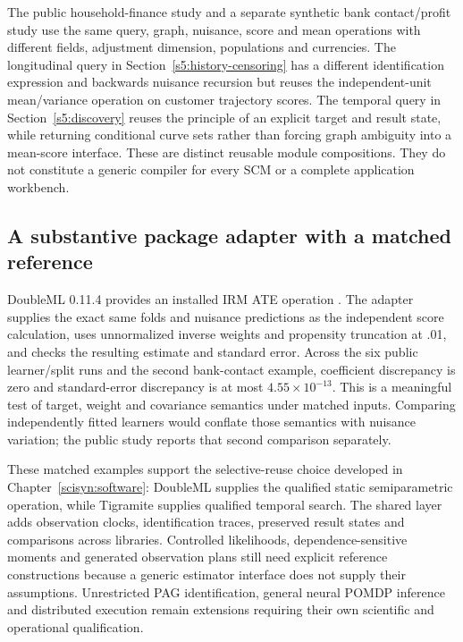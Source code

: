 The public household-finance study and a separate synthetic bank contact/profit
study use the same query, graph, nuisance, score and mean operations with
different fields, adjustment dimension, populations and currencies. The
longitudinal query in Section~\ref{s5:history-censoring} has a different
identification expression and backwards nuisance recursion but reuses the
independent-unit mean/variance operation on customer trajectory scores.
The temporal query in Section~\ref{s5:discovery} reuses the principle of an
explicit target and result state, while returning conditional curve sets
rather than forcing graph ambiguity into a mean-score interface. These are
distinct reusable module compositions. They do not constitute a generic
compiler for every SCM or a complete application workbench.

\subsection{A substantive package adapter with a matched reference}
DoubleML 0.11.4 provides an installed IRM ATE operation
\citep{doubleml2022,runtime_doubleml_scope}. The adapter supplies the exact
same folds and nuisance predictions as the independent score calculation,
uses unnormalized inverse weights and propensity truncation at .01, and
checks the resulting estimate and standard error. Across the six public
learner/split runs and the second bank-contact example, coefficient
discrepancy is zero and standard-error discrepancy is at most
$4.55\times10^{-13}$. This is a meaningful test of target, weight and
covariance semantics under matched inputs. Comparing independently fitted
learners would conflate those semantics with nuisance variation; the public
study reports that second comparison separately.

These matched examples support the selective-reuse choice developed in
Chapter~\ref{scisyn:software}: DoubleML supplies the qualified static
semiparametric operation, while Tigramite supplies qualified temporal search.
The shared layer adds observation clocks, identification traces, preserved
result states and comparisons across libraries. Controlled likelihoods,
dependence-sensitive moments and generated observation plans still need
explicit reference constructions because a generic estimator interface does
not supply their assumptions. Unrestricted PAG identification, general neural
POMDP inference and distributed execution remain extensions requiring their
own scientific and operational qualification.

